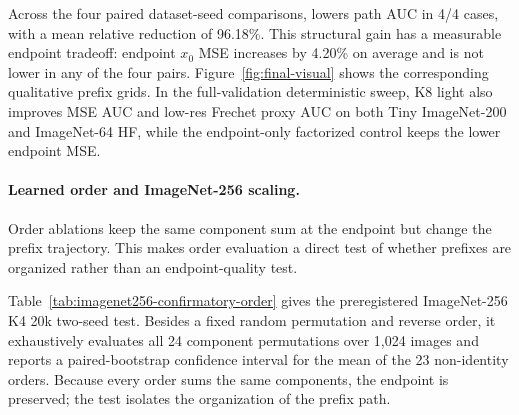\begin{table}[t]
  \centering
  \caption{Matched 20k two-seed comparison (mean $\pm$ sample standard
  deviation over seeds 103 and 139). Endpoint $x_0$ MSE and path AUC use
  1,024 validation images at $t=500$; lower is better. Higher is better for
  effective token count.}
  \label{tab:fair20k}
  \small
\end{table}

Across the four paired dataset-seed comparisons, \method{} lowers path AUC in
4/4 cases, with a mean relative reduction of 96.18\%. This structural gain has
a measurable endpoint tradeoff: endpoint $x_0$ MSE increases by 4.20\% on average and
is not lower in any of the four pairs. Figure~\ref{fig:final-visual} shows the
corresponding qualitative prefix grids.
In the full-validation deterministic sweep, K8 light also improves MSE AUC and
low-res Frechet proxy AUC on both Tiny ImageNet-200 and ImageNet-64 HF, while
the endpoint-only factorized control keeps the lower endpoint MSE.

\paragraph{Learned order and ImageNet-256 scaling.}

Order ablations keep the same component sum at the endpoint but change the
prefix trajectory. This makes order evaluation a direct test of whether prefixes
are organized rather than an endpoint-quality test.

Table~\ref{tab:imagenet256-confirmatory-order} gives the preregistered
ImageNet-256 K4 20k two-seed test. Besides a fixed random permutation and
reverse order, it exhaustively evaluates all 24 component permutations over
1,024 images and reports a paired-bootstrap confidence interval for the mean of
the 23 non-identity orders. Because every order sums the same components, the
endpoint is preserved; the test isolates the organization of the prefix path.

